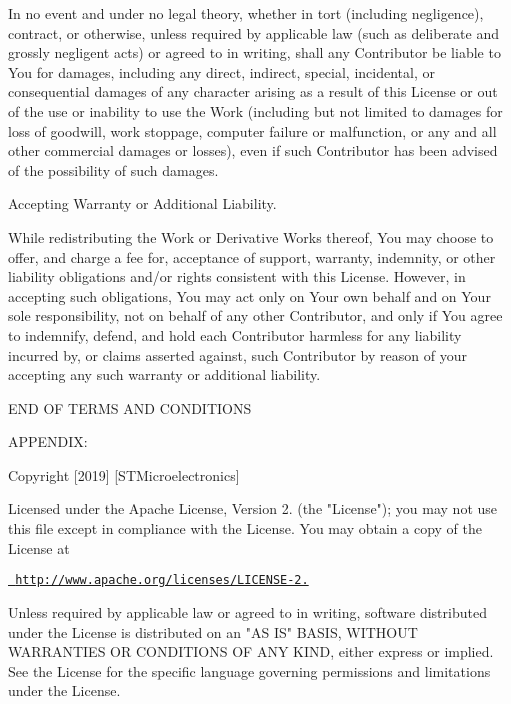In no event and under no legal theory, whether in tort (including negligence), contract, or otherwise, unless required by applicable law (such as deliberate and grossly negligent acts) or agreed to in writing, shall any Contributor be liable to You for damages, including any direct, indirect, special, incidental, or consequential damages of any character arising as a result of this License or out of the use or inability to use the Work (including but not limited to damages for loss of goodwill, work stoppage, computer failure or malfunction, or any and all other commercial damages or losses), even if such Contributor has been advised of the possibility of such damages.


\begin{DoxyEnumerate}
\item Accepting Warranty or Additional Liability.
\end{DoxyEnumerate}

While redistributing the Work or Derivative Works thereof, You may choose to offer, and charge a fee for, acceptance of support, warranty, indemnity, or other liability obligations and/or rights consistent with this License. However, in accepting such obligations, You may act only on Your own behalf and on Your sole responsibility, not on behalf of any other Contributor, and only if You agree to indemnify, defend, and hold each Contributor harmless for any liability incurred by, or claims asserted against, such Contributor by reason of your accepting any such warranty or additional liability.

END OF TERMS AND CONDITIONS

APPENDIX\+:

Copyright \mbox{[}2019\mbox{]} \mbox{[}STMicroelectronics\mbox{]}

Licensed under the Apache License, Version 2. (the "{}\+License"{}); you may not use this file except in compliance with the License. You may obtain a copy of the License at

\href{http://www.apache.org/licenses/LICENSE-2.0}{\texttt{ http\+://www.\+apache.\+org/licenses/\+LICENSE-\/2.}}

Unless required by applicable law or agreed to in writing, software distributed under the License is distributed on an "{}\+AS IS"{} BASIS, WITHOUT WARRANTIES OR CONDITIONS OF ANY KIND, either express or implied. See the License for the specific language governing permissions and limitations under the License. 